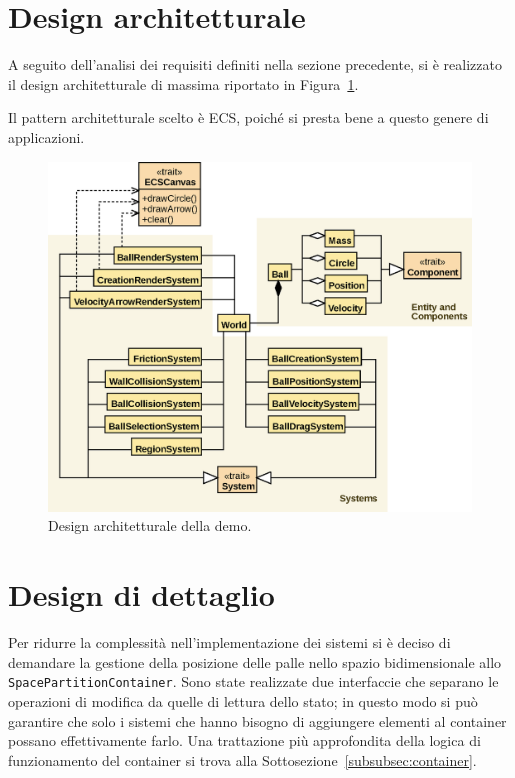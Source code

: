 \section{Design architetturale}\label{sec:demo-design-architetturale}
A seguito dell'analisi dei requisiti definiti nella sezione precedente, si è realizzato il design architetturale di
massima riportato in Figura~\ref{fig:demo}.

Il pattern architetturale scelto è ECS, poiché si presta bene a questo genere di applicazioni.

\begin{figure}[H]
    \centering
    \includegraphics[width=\textwidth]{./img/Demo}
    \caption{Design architetturale della demo.}
    \label{fig:demo}
\end{figure}

\section{Design di dettaglio}\label{sec:demo-design-di-dettaglio}
Per ridurre la complessità nell'implementazione dei sistemi si è deciso di demandare la gestione della posizione delle
palle nello spazio bidimensionale allo \texttt{SpacePartitionContainer}.
Sono state realizzate due interfaccie che separano le operazioni di modifica da quelle di lettura dello stato;
in questo modo si può garantire che solo i sistemi che hanno bisogno di aggiungere elementi al container possano
effettivamente farlo.
Una trattazione più approfondita della logica di funzionamento del container si trova alla
Sottosezione~\ref{subsubsec:container}.

